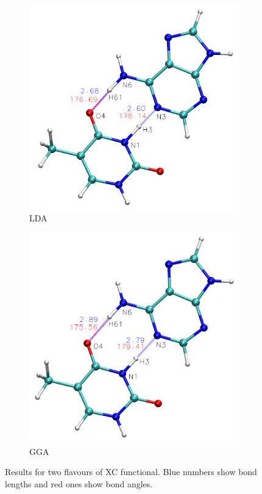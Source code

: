 \documentclass[12pt,a4paper]{scrartcl}
\begin{document}
\begin{figure}[H]
        \centering
        \begin{subfigure}[b]{0.49\textwidth}
                \centering
                \includegraphics[width=\textwidth]{lda.jpg}
                \caption{LDA}
                \label{fig:gull}
        \end{subfigure}
        \begin{subfigure}[b]{0.49\textwidth}
                \centering
                \includegraphics[width=\textwidth]{gga.jpg}
                \caption{GGA}
                \label{fig:tiger}
        \end{subfigure}
        \caption{Results for two flavours of XC functional. Blue numbers show bond lengths and red ones show bond angles.}\label{fig:ade-thy}
\end{figure}
\end{document}
